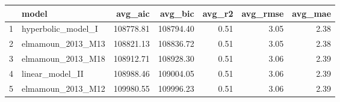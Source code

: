 \begin{table}[ht]
\centering
\begin{tabular}{rlrrrrr}
  \hline
 & model & avg\_aic & avg\_bic & avg\_r2 & avg\_rmse & avg\_mae \\ 
  \hline
1 & hyperbolic\_model\_I & 108778.81 & 108794.40 & 0.51 & 3.05 & 2.38 \\ 
  2 & elmamoun\_2013\_M13 & 108821.13 & 108836.72 & 0.51 & 3.05 & 2.38 \\ 
  3 & elmamoun\_2013\_M18 & 108912.71 & 108928.30 & 0.51 & 3.06 & 2.39 \\ 
  4 & linear\_model\_II & 108988.46 & 109004.05 & 0.51 & 3.06 & 2.39 \\ 
  5 & elmamoun\_2013\_M12 & 109980.55 & 109996.23 & 0.51 & 3.06 & 2.39 \\ 
   \hline
\end{tabular}
\end{table}
